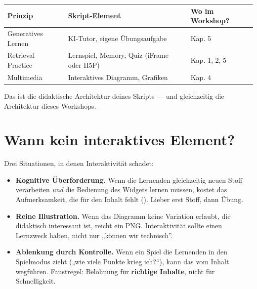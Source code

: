 \documentclass[
  ngerman,
  a4paper,
  DIV=11]{scrreprt}
\providecommand{\tightlist}{%
  \setlength{\itemsep}{0pt}\setlength{\parskip}{0pt}}
\begin{document}
\begin{longtable}[]{@{}
  >{\raggedright\arraybackslash}p{}
  >{\raggedright\arraybackslash}p{}
  >{\raggedright\arraybackslash}p{}@{}}
\toprule\noalign{}
\begin{minipage}[b]{\linewidth}\raggedright
Prinzip
\end{minipage} & \begin{minipage}[b]{\linewidth}\raggedright
Skript-Element
\end{minipage} & \begin{minipage}[b]{\linewidth}\raggedright
Wo im Workshop?
\end{minipage} \\
\midrule\noalign{}
\endhead
\bottomrule\noalign{}
\endlastfoot
Generatives Lernen & KI-Tutor, eigene Übungsaufgabe & Kap. 5 \\
Retrieval Practice & Lernspiel, Memory, Quiz (iFrame oder H5P) & Kap. 1,
2, 5 \\
Multimedia & Interaktives Diagramm, Grafiken & Kap. 4 \\
\end{longtable}

Das ist die didaktische Architektur deines Skripts --- und gleichzeitig
die Architektur dieses Workshops.

\section{\texorpdfstring{Wann \textbf{kein} interaktives
Element?}{Wann kein interaktives Element?}}\label{wann-kein-interaktives-element}

Drei Situationen, in denen Interaktivität schadet:

\begin{itemize}
\tightlist
\item
  \textbf{Kognitive Überforderung.} Wenn die Lernenden gleichzeitig
  neuen Stoff verarbeiten \emph{und} die Bedienung des Widgets lernen
  müssen, kostet das Aufmerksamkeit, die für den Inhalt fehlt
  (). Lieber erst Stoff, dann
  Übung.
\item
  \textbf{Reine Illustration.} Wenn das Diagramm keine Variation
  erlaubt, die didaktisch interessant ist, reicht ein PNG.
  Interaktivität sollte einen Lernzweck haben, nicht nur „können wir
  technisch''.
\item
  \textbf{Ablenkung durch Kontrolle.} Wenn ein Spiel die Lernenden in
  den Spielmodus zieht („wie viele Punkte krieg ich?{}``), kann das vom
  Inhalt wegführen. Faustregel: Belohnung für \textbf{richtige Inhalte},
  nicht für Schnelligkeit.
\end{itemize}
\end{document}
